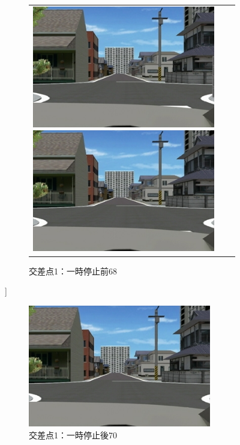 \begin{figure}[htbp]
  \begin{center}
    \begin{tabular}{ccc}
      \begin{minipage}{0.5\hsize}
        \begin{center}
          \includegraphics[clip, width=8.0cm]{./images/ds1stop066.png}
          \caption{交差点1：一時停止前66}
         \label{fig:ds1stop66}
        \end{center}
      \end{minipage}
      \begin{minipage}{0.5\hsize}
        \begin{center}
          \includegraphics[clip, width=8.0cm]{./images/ds1stop068.png}
          \caption{交差点1：一時停止前68}
         \label{fig:ds1stop68}
        \end{center}
      \end{minipage}
    \end{tabular}
  \end{center}
\end{figure}]

\newpage

\begin{figure}[htbp]
  \begin{center}
    \includegraphics[clip,width=8.0cm]{./images/ds1stop070.png}
    \caption{交差点1：一時停止後70}
    \label{fig:ds1stop70}
  \end{center}
\end{figure}

